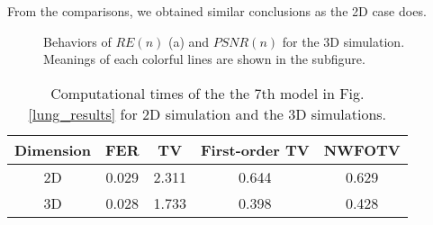 \documentclass[lettersize,journal]{IEEEtran}
\begin{document}
From the comparisons, we obtained similar conclusions as the 2D case does.

\begin{figure*}[htbp]
\centering
  \centering
 \caption{The reconstruction results using four different regularizers. (a) is the reconstruction using the primal-dual algorithm for TV regularizer at the 10th steps. (b) depicts the result of FER for the regularization parameter set to be $\infty$. (c) is the reconstructions using the first-order TV regularizer at the 10th iteration. (d)is the results using the NWATV at the 10th step.}
\label{numerical_results}
\end{figure*}



\begin{figure*}[htbp]
\centering
{}
\centering
\caption{Profiles of the reconstructed conductivity along the solid line (a), the slash line (b) and the dot dash line (c) shown in Fig. \ref{numerical_results} (d). The meaning of each colorful lines in (a)-(c) are shown in each subfigure.}
\label{1D profiles}
\end{figure*}

\begin{figure}[h]
\centering
{}
\centering
\caption{Behaviors of $RE(n)$ (a) and $PSNR(n)$ for the 3D simulation. Meanings of each colorful lines are shown in the subfigure.}
\label{quantitative indicators}
\end{figure}


\begin{table}
\centering
\caption{Computational times of the the 7th model in Fig. \ref{lung_results} for 2D simulation and the 3D simulations.}
\begin{tabular}{ccccc}
\hline\hline
Dimension                & FER      & TV       & First-order TV & NWFOTV   \\ \hline
2D & 0.029 & 2.311 & 0.644       & 0.629 \\
3D & 0.028 & 1.733 & 0.398 & 0.428 \\
\hline\hline
\end{tabular}
\end{table}
\end{document}
